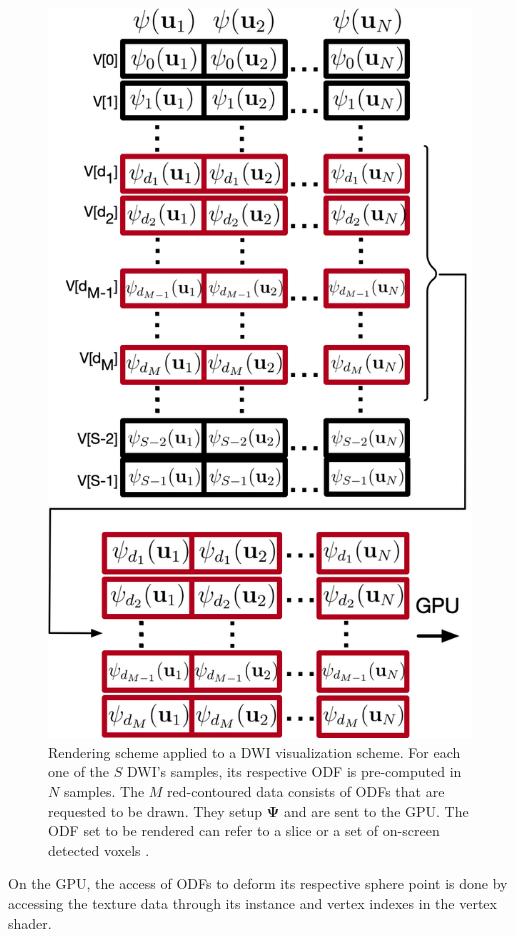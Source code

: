 \documentclass[twoside,twocolumn,10pt]{article}
\begin{document}
\begin{figure}[ht]
    \centering
    \includegraphics[width=0.89\linewidth, angle=0]{figs/rendering_scheme/organizacao2GPU_red1.png}
    \caption{Rendering scheme applied to a DWI visualization scheme. For each one of the $S$ DWI's samples, its respective ODF is pre-computed in $N$ samples. The $M$ red-contoured data consists of ODFs that are requested to be drawn. They setup $\bm{\Psi}$ and are sent to the GPU. The ODF set to be rendered can refer to a slice or a set of on-screen detected voxels \cite{voltoline2021}.}
    \label{fig::vmtk_precomputed2GPU}
\end{figure}



On the GPU, the access of ODFs to deform its respective sphere point is done by accessing the texture data through its instance and vertex indexes in the vertex shader.
\end{document}
